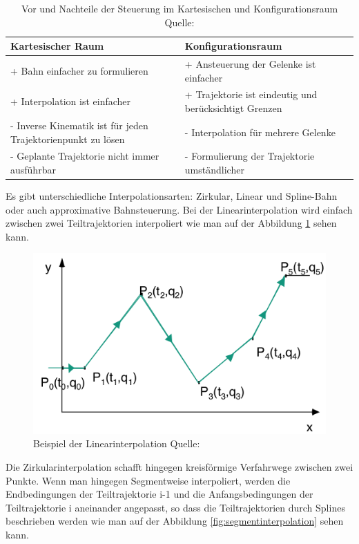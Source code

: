 \begin{table}[h]
		\centering
		\begin{tabular}{| p{7cm} | p{7cm}|}
\hline
\textbf{Kartesischer Raum} & \textbf{Konfigurationsraum}\\
\hline
+ Bahn einfacher zu formulieren & + Ansteuerung der Gelenke ist
einfacher\\
+ Interpolation ist einfacher & + Trajektorie ist eindeutig und
berücksichtigt Grenzen\\

- Inverse Kinematik ist für jeden Trajektorienpunkt zu lösen & - Interpolation für mehrere
Gelenke\\
- Geplante Trajektorie nicht immer ausführbar & - Formulierung der Trajektorie umständlicher\\
\hline
		\end{tabular}
		\caption{\label{fig:steurungProContra} Vor und Nachteile der Steuerung im Kartesischen und Konfigurationsraum Quelle: \citep{rob1}}
		\end{table}	
Es gibt unterschiedliche Interpolationsarten:  Zirkular, Linear und Spline-Bahn oder auch approximative Bahnsteuerung.
Bei der Linearinterpolation wird einfach zwischen zwei Teiltrajektorien interpoliert wie man auf der Abbildung \ref{fig:linearinterpolation} sehen kann.
\begin{figure}[h]
	\center
	\includegraphics[scale=0.35]{graphics/linearinterpolation.png}
	\caption{\label{fig:linearinterpolation} Beispiel der Linearinterpolation Quelle: \citep{rob1}}
\end{figure}
 Die Zirkularinterpolation schafft hingegen kreisförmige Verfahrwege zwischen zwei Punkte. Wenn man hingegen  Segmentweise interpoliert, werden die Endbedingungen der Teiltrajektorie i-1 und die Anfangsbedingungen der Teiltrajektorie i aneinander angepasst, so dass die Teiltrajektorien durch Splines beschrieben werden wie man auf der Abbildung \ref{fig:segmentinterpolation} sehen kann.
